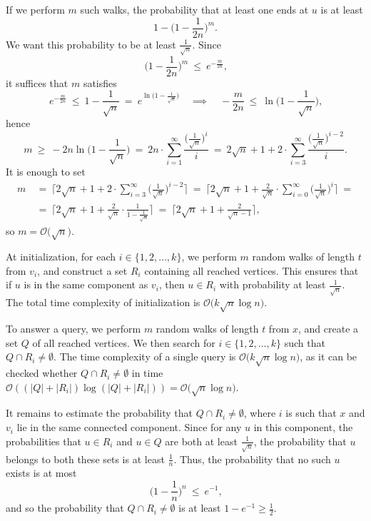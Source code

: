 \documentclass[12pt]{article}
\begin{document}
	If we perform \(m\) such walks, the probability that at least one ends at
	\(u\) is at least
	\[
		1 - \bigg( 1 - \frac{1}{2n} \bigg)^{m} \text{.}
	\]
	We want this probability to be at least \(\frac{1}{\sqrt{n}}\). Since
	\[
		\bigg( 1 - \frac{1}{2 n} \bigg)^{m} \ \leqslant \ e^{- \frac{m}{2 n}}
		\text{,}
	\]
	it suffices that \(m\) satisfies
	\[
		e^{- \frac{m}{2 n}} \ \leqslant \ 1 - \frac{1}{\sqrt{n}} \ = \
		e^{\ln \big( 1 - \frac{1}{\sqrt{n}} \big)} \quad \implies \quad -
		\frac{m}{2 n} \ \leqslant \ \ln \bigg( 1 - \frac{1}{\sqrt{n}} \bigg)
		\text{,}
	\]
	hence
	\[
		m \ \geqslant \ - 2 n \ln \bigg( 1 - \frac{1}{\sqrt{n}} \bigg) \ = \ 2 n
		\cdot \sum\limits_{i = 1}^{\infty}
		\frac{\Big( \frac{1}{\sqrt{n}} \Big)^{i}}{i} \ = \ 2 \sqrt{n} + 1 + 2
		\cdot \sum\limits_{i = 3}^{\infty}
		\frac{\Big( \frac{1}{\sqrt{n}} \Big)^{i - 2}}{i} \text{.}
	\]
	It is enough to set
	\begin{align*}
		m \ &= \ \Bigg\lceil 2 \sqrt{n} + 1 + 2 \cdot
		\sum\limits_{i = 3}^{\infty} \bigg( \frac{1}{\sqrt{n}} \bigg)^{i - 2}
		\Bigg\rceil \ = \ \Bigg\lceil 2 \sqrt{n} + 1 + \frac{2}{\sqrt{n}} \cdot
		\sum\limits_{i = 0}^{\infty} \bigg( \frac{1}{\sqrt{n}} \bigg)^{i}
		\Bigg\rceil \ = \\
		&= \ \Bigg\lceil 2 \sqrt{n} + 1 + \frac{2}{\sqrt{n}} \cdot
		\frac{1}{1 - \frac{1}{\sqrt{n}}} \Bigg\rceil \ = \ \bigg\lceil 2
		\sqrt{n} + 1 + \frac{2}{\sqrt{n} - 1} \bigg\rceil \text{,}
	\end{align*}
	so \(m = \mathcal{O} \big( \sqrt{n} \big)\).
	
	\medskip
	
	At initialization, for each \(i \in \{1, 2, \ldots, k\}\), we perform \(m\)
	random walks of length \(t\) from \(v_{i}\), and construct a set \(R_{i}\)
	containing all reached vertices. This ensures that if \(u\) is in the same
	component as \(v_{i}\), then \(u \in R_{i}\) with probability at least
	\(\frac{1}{\sqrt{n}}\). The total time complexity of initialization is
	\(\mathcal{O} \big( k \sqrt{n} \log n \big)\).
	
	\medskip
	
	To answer a query, we perform \(m\) random walks of length \(t\) from \(x\),
	and create a set \(Q\) of all reached vertices. We then search for \(i \in
	\{1, 2, \ldots, k\}\) such that \(Q \cap R_{i} \neq \emptyset\). The time
	complexity of a single query is \(\mathcal{O} \big( k \sqrt{n} \log n
	\big)\), as it can be checked whether \(Q \cap R_{i} \neq \emptyset\) in
	time \(\mathcal{O} ((|Q| + |R_{i}|) \log (|Q| + |R_{i}|)) = \mathcal{O}
	\big( \sqrt{n} \log n \big)\).
	
	\medskip
	
	It remains to estimate the probability that \(Q \cap R_{i} \neq \emptyset\),
	where \(i\) is such that \(x\) and \(v_{i}\) lie in the same connected
	component. Since for any \(u\) in this component, the probabilities that \(u
	\in R_{i}\) and \(u \in Q\) are both at least \(\frac{1}{\sqrt{n}}\), the
	probability that \(u\) belongs to both these sets is at least
	\(\frac{1}{n}\). Thus, the probability that no such \(u\) exists is at most
	\[
		\bigg( 1 - \frac{1}{n} \bigg)^{n} \ \leqslant \ e^{-1} \text{,}
	\]
	and so the probability that \(Q \cap R_{i} \neq \emptyset\) is at least
	\(1 - e^{-1} \geqslant \frac{1}{2}\).
\end{document}
